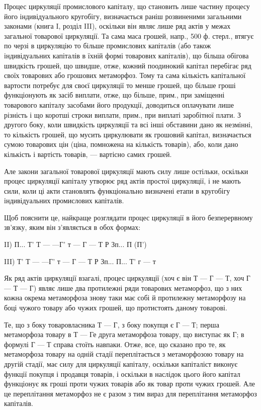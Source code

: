 Процес циркуляції промислового капіталу, що становить лише частину
процесу його індивідуального кругобігу, визначається раніш розвиненими
загальними законами (книга I, розділ III), оскільки він являє лише ряд
актів у межах загальної товарової циркуляції. Та сама маса грошей, напр.,
500 ф. стерл., втягує по черзі в циркуляцію то більше промислових капіталів
(або також індивідуальних капіталів в їхній формі товарових капіталів), що
більша обігова швидкість грошей, що швидше, отже, кожний поодинокий
капітал перебігає ряд своїх товарових або грошових метаморфоз. Тому
та сама кількість капітальної вартости потребує для своєї циркуляції то
менше грошей, що більше гроші функціонують як засіб виплати, отже,
що більше, прим., при заміщенні товарового капіталу засобами його продукції,
доводиться оплачувати лише різність і що коротші строки виплати,
прим., при виплаті заробітної плати. З другого боку, коли швидкість
циркуляції та всі інші обставини дано як незмінні, то кількість грошей,
що мусить циркулювати як грошовий капітал, визначається сумою товарових
цін (ціна, помножена на кількість товарів), або, коли дано кількість
і вартість товарів, — вартісно самих грошей.

Але закони загальної товарової циркуляції мають силу лише остільки,
оскільки процес циркуляції капіталу утворює ряд актів простої циркуляції,
і не мають сили, коли ці акти становлять функціонально визначені
етапи в кругобігу індивідуальних промислових капіталів.

Щоб пояснити це, найкраще розглядати процес циркуляції в його
безперервному зв’язку, яким він з’являється в обох формах:

II) П... Т' Т — —Г' т —  Г — Т Р Зп... П (П')

III) Т' Т — —Г' т —  Г — Т Р Зп... П... Т' г — т

Як ряд актів циркуляції взагалі, процес циркуляції (хоч є він Т — Г — Т,
хоч Г — Т — Г) являє лише два протилежні ряди товарових метаморфоз,
що з них кожна окрема метаморфоза знову таки має собі й протилежну
метаморфозу на боці чужого товару або чужих грошей, що протистоять
даному товарові.

Те, що з боку товаровласника Т — Г, з боку покупця є Г — Т; перша
метаморфоза товару в Т — Ге друга метаморфоза товару, що виступає
як Г; в формулі Г — Т справа стоїть навпаки. Отже, все, що сказано
про те, як метаморфоза товару на одній стадії переплітається з метаморфозою
товару на другій стадії, має силу для циркуляції капіталу,
оскільки капіталіст виконує функції покупця і продавця товарів, і
оскільки в наслідок цього його капітал функціонує як гроші проти
чужих товарів або як товар проти чужих грошей. Але це переплітання
метаморфоз не є разом з тим вираз для переплітання метаморфоз капіталів.

